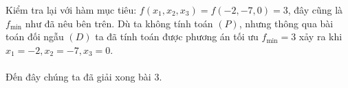\documentclass[12pt]{article}
\begin{document}
Kiểm tra lại với hàm mục tiêu: $f(x_1, x_2, x_3) = f(-2, -7, 0) = 3$, đây cũng là $f_{\min}$ như đã nêu bên trên. Dù ta không tính toán $(P)$, nhưng thông qua bài toán đối ngẫu $(D)$ ta đã tính toán được phương án tối ưu $f_{\min} = 3$ xảy ra khi $x_1 = -2, x_2 = -7, x_3 = 0$.
\\\\
Đến đây chúng ta đã giải xong bài 3.
\cleardoublepage
{}
{}


\end{document}
